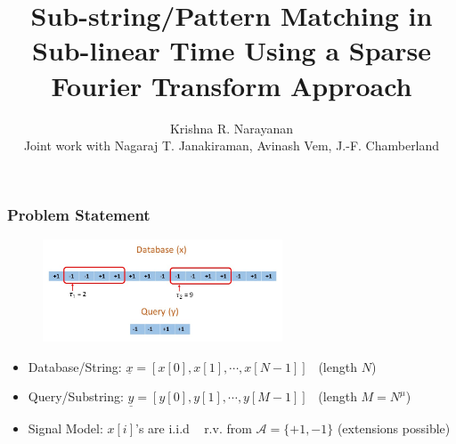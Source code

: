 \documentclass[10pt,xcolor=table]{beamer}
\newcommand{\xv}{\underline{x}}
\newcommand{\yv}{\underline{y}}
\begin{document}
\title{Sub-string/Pattern Matching in Sub-linear Time Using a Sparse Fourier Transform Approach}
\author{ Krishna R. Narayanan \\
Joint work with Nagaraj T. Janakiraman, Avinash Vem, J.-F. Chamberland \\
}
\date{}
\frame{\titlepage}
\begin{frame}\frametitle{Problem Statement}
 	\vspace{-0.4cm}
	\begin{figure}[t]
		\centering
		\includegraphics[width=2.8in]{Pattern_matching_ex.jpg}
	\end{figure}
	\vspace{-10pt}
	\begin{block}{}
\begin{itemize}\itemsep5pt
	\item {\color{blue} Database/String}: $\xv = [x[0], x[1], \cdots, x[N-1]]$ \ (length $N$)
	\item { \color{blue} Query/Substring}: $\yv = [y[0], y[1], \cdots, y[M-1]]$ \ (length $M = N^\mu$)
	\item {\color{blue} Signal Model:} $x[i]$'s are i.i.d ~ r.v. from $\mathcal{A} = \{+1,-1\}$ (extensions possible)
\end{itemize}
\end{block}


\end{frame}
\end{document}

